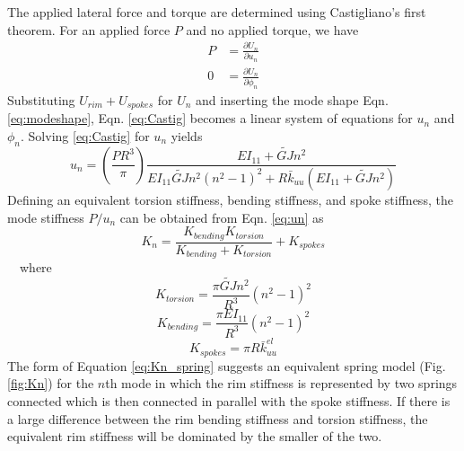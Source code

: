 \documentclass{bmd2016p}
\begin{document}
The applied lateral force and torque are determined using Castigliano's first theorem. For an applied force $P$ and no applied torque, we have
	\begin{equation}\label{eq:Castig}
	\begin{split}
	P &= \frac{\partial U_n}{\partial u_n}\\%
	0 &= \frac{\partial U_n}{\partial \phi_n}%
	\end{split}
	\end{equation}
Substituting $U_{rim} + U_{spokes}$ for $U_n$ and inserting the mode shape Eqn. \ref{eq:modeshape}, Eqn. \ref{eq:Castig} becomes a linear system of equations for $u_n$ and $\phi_n$. Solving \ref{eq:Castig} for $u_n$ yields
	\begin{equation}\label{eq:un}
	u_n = \left(\frac{PR^3}{\pi}\right) \frac{EI_{11}+\widetilde{GJ}n^2}{EI_{11}\widetilde{GJ}n^2(n^2-1)^2 + R\bar{k}_{uu}(EI_{11}+\widetilde{GJ}n^2)}
	\end{equation}
Defining an equivalent torsion stiffness, bending stiffness, and spoke stiffness, the mode stiffness $P/u_n$ can be obtained from Eqn. \ref{eq:un} as
	\begin{equation}\label{eq:Kn_spring}
	K_n = \frac{K_{bending}K_{torsion}}{K_{bending}+K_{torsion}} + K_{spokes}
	\end{equation}
\,\,\,\, where
	\begin{equation}\label{eq:Ktorsion}
	K_{torsion} = \frac{\pi\widetilde{GJ}n^2}{R^3}(n^2-1)^2
	\end{equation}
	\begin{equation}\label{eq:Kbending}
	K_{bending} = \frac{\pi EI_{11}}{R^3}(n^2-1)^2
	\end{equation}
	\begin{equation}\label{eq:Kspokes}
	K_{spokes} = \pi R \bar{k}_{uu}^{el}
	\end{equation}
The form of Equation \ref{eq:Kn_spring} suggests an equivalent spring model (Fig. \ref{fig:Kn}) for the $n$th mode in which the rim stiffness is represented by two springs connected which is then connected in parallel with the spoke stiffness. If there is a large difference between the rim bending stiffness and torsion stiffness, the equivalent rim stiffness will be dominated by the smaller of the two.
\end{document}
